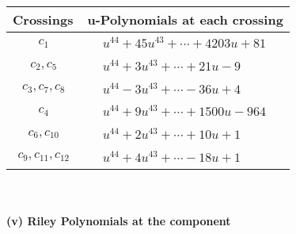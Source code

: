 \documentclass[1p]{elsarticle_modified}
\theoremstyle{definition}
\begin{document}
\begin{tabular}{m{50pt}|m{274pt}}
Crossings & \hspace{64pt}u-Polynomials at each crossing \\
\hline $$\begin{aligned}c_{1}\end{aligned}$$&$\begin{aligned}
&u^{44}+45 u^{43}+\cdots+4203 u+81
\end{aligned}$\\
\hline $$\begin{aligned}c_{2},c_{5}\end{aligned}$$&$\begin{aligned}
&u^{44}+3 u^{43}+\cdots+21 u-9
\end{aligned}$\\
\hline $$\begin{aligned}c_{3},c_{7},c_{8}\end{aligned}$$&$\begin{aligned}
&u^{44}-3 u^{43}+\cdots-36 u+4
\end{aligned}$\\
\hline $$\begin{aligned}c_{4}\end{aligned}$$&$\begin{aligned}
&u^{44}+9 u^{43}+\cdots+1500 u-964
\end{aligned}$\\
\hline $$\begin{aligned}c_{6},c_{10}\end{aligned}$$&$\begin{aligned}
&u^{44}+2 u^{43}+\cdots+10 u+1
\end{aligned}$\\
\hline $$\begin{aligned}c_{9},c_{11},c_{12}\end{aligned}$$&$\begin{aligned}
&u^{44}+4 u^{43}+\cdots-18 u+1
\end{aligned}$\\
\hline
\end{tabular}\\~\\
\newpage\renewcommand{\arraystretch}{1}
\flushleft \textbf{(v) Riley Polynomials at the component}\newline \\
\end{document}
